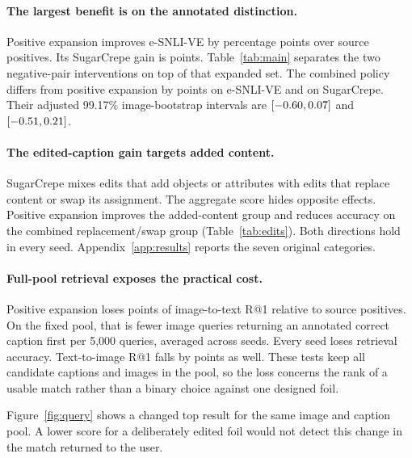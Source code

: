 
\paragraph{The largest benefit is on the annotated distinction.}
Positive expansion improves e-SNLI-VE by \PositiveRelationGain{} percentage points over source positives. Its SugarCrepe gain is \PositiveSugarGain{} points. Table~\ref{tab:main} separates the two negative-pair interventions on top of that expanded set. The combined policy differs from positive expansion by \CombinedRelationDelta{} points on e-SNLI-VE and \CombinedSugarDelta{} on SugarCrepe. Their adjusted 99.17\% image-bootstrap intervals are $[-0.60,0.07]$ and $[-0.51,0.21]$.

\paragraph{The edited-caption gain targets added content.}
SugarCrepe mixes edits that add objects or attributes with edits that replace content or swap its assignment. The aggregate score hides opposite effects. Positive expansion improves the added-content group and reduces accuracy on the combined replacement/swap group (Table~\ref{tab:edits}). Both directions hold in every seed. Appendix~\ref{app:results} reports the seven original categories.


\paragraph{Full-pool retrieval exposes the practical cost.}
Positive expansion loses \PositiveRetrievalLoss{} points of image-to-text R@1 relative to source positives. On the fixed pool, that is \ExtraFailedImageQueries{} fewer image queries returning an annotated correct caption first per 5,000 queries, averaged across seeds. Every seed loses retrieval accuracy. Text-to-image R@1 falls by \PositiveTextRetrievalLoss{} points as well. These tests keep all candidate captions and images in the pool, so the loss concerns the rank of a usable match rather than a binary choice against one designed foil.


Figure~\ref{fig:query} shows a changed top result for the same image and caption pool. A lower score for a deliberately edited foil would not detect this change in the match returned to the user.

